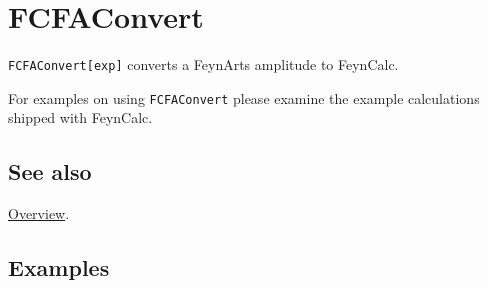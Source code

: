 \documentclass[../FeynCalcManual.tex]{subfiles}
\begin{document}
\hypertarget{fcfaconvert}{
\section{FCFAConvert}\label{fcfaconvert}}

\texttt{FCFAConvert[\allowbreak{}exp]} converts a FeynArts amplitude to
FeynCalc.

For examples on using \texttt{FCFAConvert} please examine the example
calculations shipped with FeynCalc.

\subsection{See also}

\hyperlink{toc}{Overview}.

\subsection{Examples}
\end{document}
